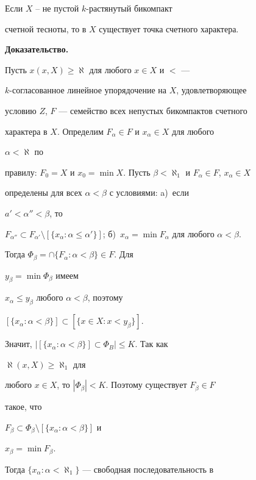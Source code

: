  


\begin{thm} 


Если $X$ -- не пустой $k$-растянутый бикомпакт  


счетной тесноты, то в $X$ существует точка счетного характера. 


\end{thm} 


 


{\bf Доказательство.} 


Пусть $x(x,X)\ge\aleph$ для любого $x\in X$ и $<$ --- 


$k$-согласованное линейное упорядочение на $X$, удовлетворяющее  


условию $Z$, $F$ --- семейство всех непустых бикомпактов счетного  


характера в $X$. Определим $F_\alpha\in F$ и $x_\alpha\in X$ для любого 


$\alpha<\aleph$ по 


правилу: $F_0=X$ и $x_0=\min X$. Пусть $\beta<\aleph_1$ и $F_\alpha\in 


F$, $x_\alpha\in X$ 


определены для всех $\alpha<\beta$ с условиями: a)~если 


$a'<\alpha''<\beta$, то  


$F_{\alpha''}\subset 


F_{\alpha'}\setminus[\{x_\alpha:\alpha\le\alpha'\}]$; б)~$x_\alpha=\min 


F_\alpha$ для любого $\alpha<\beta$. 


Тогда $\Phi_\beta=\cap\{F_\alpha:\alpha<\beta\}\in F$. Для 


$y_\beta=\min\Phi_\beta$ имеем  


$x_\alpha\le y_\beta$ любого $\alpha<\beta$, поэтому 


$[\{x_\alpha:\alpha<\beta\}]\subset[\{x\in X:x<y_\beta\}]$. 


Значит, $|[\{x_\alpha:\alpha<\beta\}]\subset\Phi_B|\le K$. Так как 


$\aleph(x,X)\ge\aleph_1$ для  


любого $x\in X$, то $|\Phi_\beta|<K$. Поэтому существует $F_\beta\in F$ 


такое, что  


$F_\beta\subset\Phi_\beta\setminus[\{x_\alpha:\alpha<\beta\}]$ и 


$x_\beta=\min F_\beta$. 


Тогда $\{x_\alpha:\alpha<\aleph_1\}$ --- свободная последовательность в 


